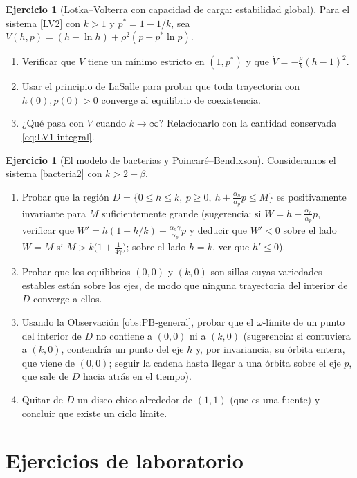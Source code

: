 \documentclass[12pt, a4paper]{amsbook}
\theoremstyle{remark}
\theoremstyle{definition}
\newtheorem{ejer}[teo]{Ejercicio}
\numberwithin{section}{chapter}
\numberwithin{subsection}{section}
\numberwithin{equation}{section}
\numberwithin{figure}{chapter}
\begin{document}
\begin{ejer}[Lotka--Volterra con capacidad de carga: estabilidad global]
Para el sistema \eqref{LV2} con $k>1$ y $p^*=1-1/k$, sea $V(h,p) = (h-\ln h)+\rho^2(p-p^*\ln p)$.
\begin{enumerate}
\item Verificar que $V$ tiene un mínimo estricto en $(1,p^*)$ y que $\dot V = -\frac{\rho}{k}(h-1)^2$.
\item Usar el principio de LaSalle para probar que toda trayectoria con $h(0),p(0)>0$ converge al equilibrio de coexistencia.
\item ¿Qué pasa con $V$ cuando $k\to\infty$? Relacionarlo con la cantidad conservada \eqref{eq:LV1-integral}.
\end{enumerate}
\end{ejer}

\begin{ejer}[El modelo de bacterias y Poincaré--Bendixson]
Consideramos el sistema \eqref{bacteria2} con $k>2+\beta$.
\begin{enumerate}
\item Probar que la región $D=\{0\le h\le k,\ p\ge 0,\ h+\frac{\alpha_h}{\alpha_p}p\le M\}$ es positivamente invariante para $M$ suficientemente grande (sugerencia: si $W=h+\frac{\alpha_h}{\alpha_p}p$, verificar que $W' = h(1-h/k) - \frac{\alpha_h\gamma}{\alpha_p}p$ y deducir que $W'<0$ sobre el lado $W=M$ si $M>k\bigl(1+\frac{1}{4\gamma}\bigr)$; sobre el lado $h=k$, ver que $h'\le 0$).
\item Probar que los equilibrios $(0,0)$ y $(k,0)$ son sillas cuyas variedades estables están sobre los ejes, de modo que ninguna trayectoria del interior de $D$ converge a ellos.
\item Usando la Observación \ref{obs:PB-general}, probar que el $\omega$-límite de un punto del interior de $D$ no contiene a $(0,0)$ ni a $(k,0)$ (sugerencia: si contuviera a $(k,0)$, contendría un punto del eje $h$ y, por invariancia, su órbita entera, que viene de $(0,0)$; seguir la cadena hasta llegar a una órbita sobre el eje $p$, que sale de $D$ hacia atrás en el tiempo).
\item Quitar de $D$ un disco chico alrededor de $(1,1)$ (que es una fuente) y concluir que existe un ciclo límite.
\end{enumerate}
\end{ejer}

\section{Ejercicios de laboratorio}
\end{document}

